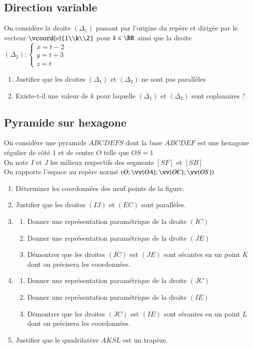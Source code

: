 \documentclass[oneside,12pt]{article}          %
\begin{document}
\subsection{Direction variable}
On considère la droite $(\Delta_1)$ passant par l'origine du repère et dirigée par le vecteur $\vcoord{v}{1\\k\\2}$ pour $k\in\RR$ ainsi que la droite $(\Delta_2): \begin{cases}x=t-2\\y=t+3\\z=t\end{cases}$
\begin{enumerate}
    \item Justifier que les droites $(\Delta_1)$ et $(\Delta_2)$ ne sont pas parallèles
	\item Existe-t-il une valeur de $k$ pour laquelle $(\Delta_1)$ et $(\Delta_2)$ sont coplanaires ?
\end{enumerate}



\subsection{Pyramide sur hexagone}
On considère une pyramide $ABCDEFS$ dont la base $ABCDEF$ est une hexagone régulier de côté 1 et de centre $O$ telle que $OS=1$\\
On note $I$ et $J$ les milieux respectifs des segments $[SF]$ et $[SB]$ \\
On rapporte l'espace au repère normé $(O;\vv{OA};\vv{OC};\vv{OS})$
\begin{enumerate}
    \item Déterminer les coordonnées des neuf points de la figure.
    \item Justifier que les droites $(IJ)$ et $(EC)$ sont parallèles.
    \item \begin{enumerate}
        \item Donner une représentation paramétrique de la droite $(IC)$
        \item Donner une représentation paramétrique de la droite $(JE)$
        \item Démontrer que les droites $(IC)$ est $(JE)$ sont sécantes en un point $K$ dont on précisera les coordonnées.
    \end{enumerate}
    \item \begin{enumerate}
        \item Donner une représentation paramétrique de la droite $(JC)$
        \item Donner une représentation paramétrique de la droite $(IE)$
        \item Démontrer que les droites $(JC)$ est $(IE)$ sont sécantes en un point $L$ dont on précisera les coordonnées.
    \end{enumerate}
    \item Justifier que le quadrilatère $AKSL$ est un trapèze.
\end{enumerate}
\end{document}
